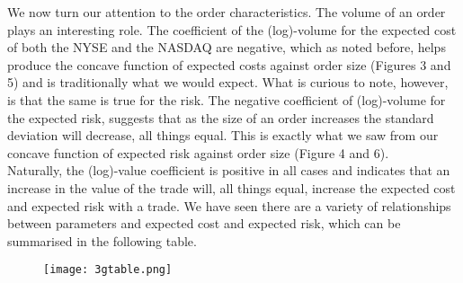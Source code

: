 \documentclass{article}
\begin{document}
We now turn our attention to the order characteristics. The volume of an order plays an interesting role. The coefficient of the (log)-volume for the expected cost of both the NYSE and the NASDAQ are negative, which as noted before, helps produce the concave function of expected costs against order size (Figures 3 and 5) and is traditionally what we would expect. What is curious to note, however, is that the same is true for the risk. The negative coefficient of (log)-volume for the expected risk, suggests that as the size of an order increases the standard deviation will decrease, all things equal. This is exactly what we saw from our concave function of expected risk against order size (Figure 4 and 6). \\

Naturally, the (log)-value coefficient is positive in all cases and indicates that an increase in the value of the trade will, all things equal, increase the expected cost and expected risk with a trade. We have seen there are a variety of relationships between parameters and expected cost and expected risk, which can be summarised in the following table. \\

\begin{figure}[h]
\texttt{[image: 3gtable.png]}
\centering
\end{figure}
\end{document}
